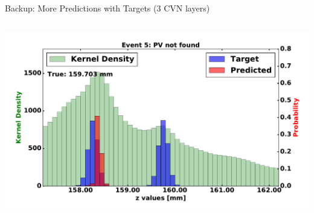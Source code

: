 \begin{frame}{Backup: More Predictions with Targets (3 CVN layers)}
\begin{columns}[c]
\begin{center}
           \includegraphics[width=1\textwidth, height=0.45\textwidth, trim=18 0 18 0]{images/120000_3layer_35.pdf}
       \end{center}
  \end{columns}
\end{frame}

